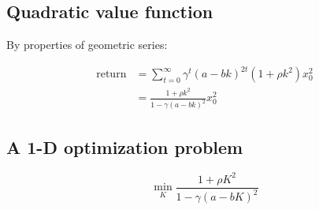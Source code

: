 \documentclass[
  letterpaper,
  DIV=11,
  numbers=noendperiod,
  oneside]{scrartcl}
\begin{document}
\subsection{Quadratic value function}\label{quadratic-value-function-1}

By properties of geometric series:

\begin{align}
\text{return} &= \sum_{t=0}^{\infty} \gamma^t (a-bk)^{2t} (1 + \rho k^2) x_0^2 \\
&= \frac{1 + \rho k^2}{1 - \gamma\left(a - bk\right)^2} x_0^2
\end{align}


\subsection{A 1-D optimization
problem}\label{a-1-d-optimization-problem-2}

\[\min_{K} \frac{1 + \rho K^2}{1 - \gamma\left(a - bK\right)^2}\]
\end{document}
